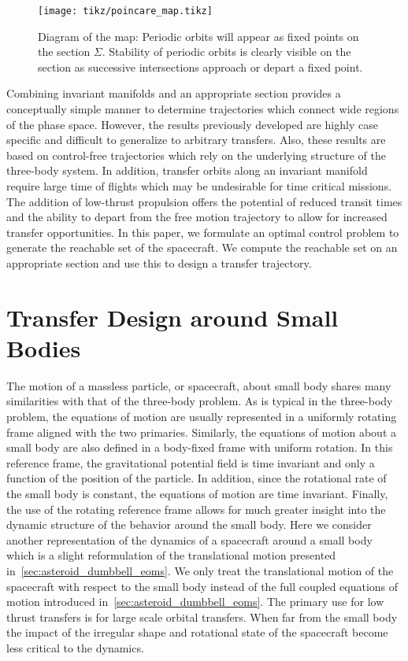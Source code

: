 \begin{figure}
    \centering
    \texttt{[image: tikz/poincare\_map.tikz]}
    \caption{Diagram of the \Poincare map: Periodic orbits will appear as fixed points on the \Poincare section \( \Sigma \). Stability of periodic orbits is clearly visible on the section as successive intersections approach or depart a fixed point.\label{fig:poincare_map}}
\end{figure}
Combining invariant manifolds and an appropriate \Poincare section provides a conceptually simple manner to determine trajectories which connect wide regions of the phase space.
However, the results previously developed are highly case specific and difficult to generalize to arbitrary transfers.
Also, these results are based on control-free trajectories which rely on the underlying structure of the three-body system.
In addition, transfer orbits along an invariant manifold require large time of flights which may be undesirable for time critical missions.
The addition of low-thrust propulsion offers the potential of reduced transit times and the ability to depart from the free motion trajectory to allow for increased transfer opportunities. 
In this paper, we formulate an optimal control problem to generate the reachable set of the spacecraft.
We compute the reachable set on an appropriate \Poincare section and use this to design a transfer trajectory.


\section{Transfer Design around Small Bodies}\label{sec:sc_eoms}

The motion of a massless particle, or spacecraft, about small body shares many similarities with that of the three-body problem.
As is typical in the three-body problem, the equations of motion are usually represented in a uniformly rotating frame aligned with the two primaries.
Similarly, the equations of motion about a small body are also defined in a body-fixed frame with uniform rotation.
In this reference frame, the gravitational potential field is time invariant and only a function of the position of the particle.
In addition, since the rotational rate of the small body is constant, the equations of motion are time invariant.
Finally, the use of the rotating reference frame allows for much greater insight into the dynamic structure of the behavior around the small body.
Here we consider another representation of the dynamics of a spacecraft around a small body which is a slight reformulation of the translational motion presented in~\cref{sec:asteroid_dumbbell_eoms}.
We only treat the translational motion of the spacecraft with respect to the small body instead of the full coupled equations of motion introduced in~\cref{sec:asteroid_dumbbell_eoms}.
The primary use for low thrust transfers is for large scale orbital transfers.
When far from the small body the impact of the irregular shape and rotational state of the spacecraft become less critical to the dynamics.

